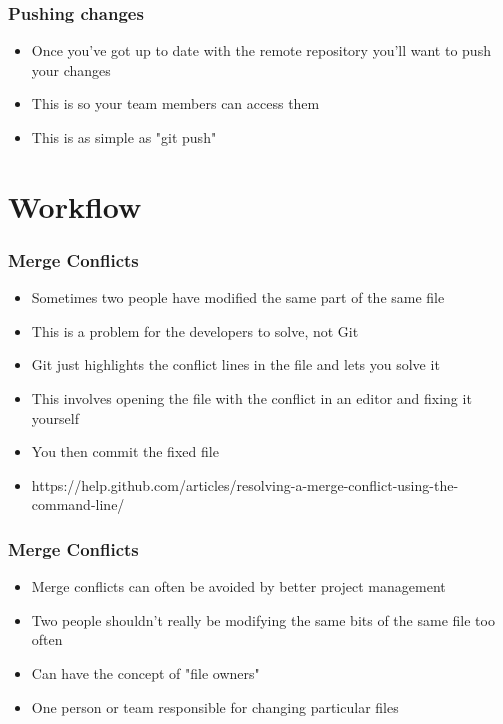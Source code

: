 \documentclass{beamer}
\begin{document}
\begin{frame}
\frametitle{Pushing changes}
\begin{itemize}
\item Once you've got up to date with the remote repository you'll want to push your changes
\item This is so your team members can access them
\item This is as simple as "git push"
\end{itemize}
\begin{figure}
\end{figure}
\end{frame}

\section{Workflow}
\begin{frame}
\frametitle{Merge Conflicts}
\begin{itemize}
\item Sometimes two people have modified the same part of the same file
\item This is a problem for the developers to solve, not Git
\item Git just highlights the conflict lines in the file and lets you solve it
\item This involves opening the file with the conflict in an editor and fixing it yourself
\item You then commit the fixed file
\item https://help.github.com/articles/resolving-a-merge-conflict-using-the-command-line/
\end{itemize}
\begin{figure}
\end{figure}
\end{frame}

\begin{frame}
\frametitle{Merge Conflicts}
\begin{itemize}
\item Merge conflicts can often be avoided by better project management
\item Two people shouldn't really be modifying the same bits of the same file too often
\item Can have the concept of "file owners"
\item One person or team responsible for changing particular files
\end{itemize}
\end{frame}
\end{document}
